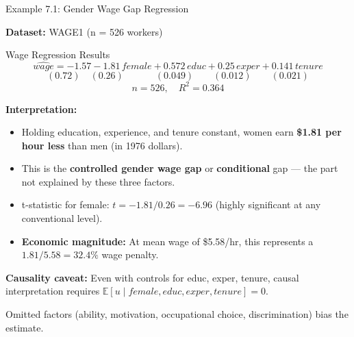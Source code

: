 \documentclass[aspectratio=169, 12pt]{beamer}
\begin{document}
\begin{frame}[shrink=30]{Example 7.1: Gender Wage Gap Regression}

  \textbf{Dataset:} WAGE1 (n = 526 workers)

  \vspace{-0.3cm}

  \begin{examplebox}{Wage Regression Results}
    \[
      \widehat{\textit{wage}} = -1.57 - 1.81 \, \textit{female} + 0.572 \, \textit{educ} + 0.25 \, \textit{exper} + 0.141 \, \textit{tenure}
    \]
    \[
      (0.72) \quad (0.26) \quad\quad\quad\; (0.049) \quad\quad (0.012) \quad\quad (0.021)
    \]
    \[
      n = 526, \quad R^2 = 0.364
    \]
  \end{examplebox}

  \medskip

  \textbf{Interpretation:}

  \begin{keybox}
    \begin{itemize}
      \item Holding education, experience, and tenure constant, women earn \textbf{\$1.81 per hour less} than men (in 1976 dollars).
      \item This is the \textbf{controlled gender wage gap} or \textbf{conditional} gap — the part not explained by these three factors.
      \item t-statistic for female: $t = -1.81 / 0.26 = -6.96$ (highly significant at any conventional level).
      \item \textbf{Economic magnitude:} At mean wage of \$5.58/hr, this represents a $1.81/5.58 = 32.4\%$ wage penalty.
    \end{itemize}
  \end{keybox}

  \medskip

  \begin{highlightbox}
    \textbf{Causality caveat:} Even with controls for educ, exper, tenure, causal interpretation requires $\mathbb{E}[u \mid \textit{female}, \textit{educ}, \textit{exper}, \textit{tenure}] = 0$.

    Omitted factors (ability, motivation, occupational choice, discrimination) bias the estimate.
  \end{highlightbox}

\end{frame}
\end{document}
